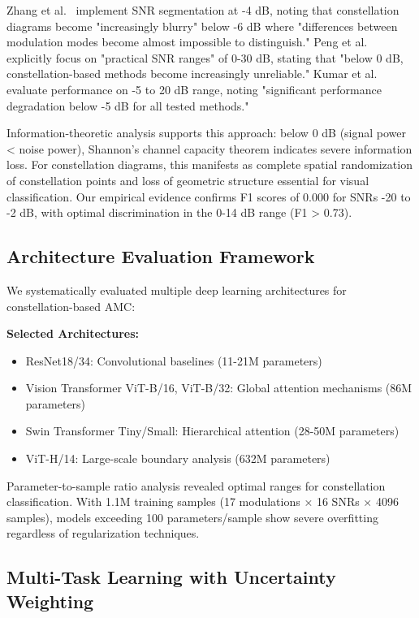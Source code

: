 \documentclass{ELSP}
\begin{document}
{{Zhang et al.~\cite{1} implement SNR segmentation at -4 dB, noting that constellation diagrams become "increasingly blurry" below -6 dB where "differences between modulation modes become almost impossible to distinguish." Peng et al.~\cite{13} explicitly focus on "practical SNR ranges" of 0-30 dB, stating that "below 0 dB, constellation-based methods become increasingly unreliable." Kumar et al.~\cite{14} evaluate performance on -5 to 20 dB range, noting "significant performance degradation below -5 dB for all tested methods."

Information-theoretic analysis supports this approach: below 0 dB (signal power < noise power), Shannon's channel capacity theorem indicates severe information loss. For constellation diagrams, this manifests as complete spatial randomization of constellation points and loss of geometric structure essential for visual classification. Our empirical evidence confirms F1 scores of 0.000 for SNRs -20 to -2 dB, with optimal discrimination in the 0-14 dB range (F1 > 0.73).

\subsection{Architecture Evaluation Framework}

We systematically evaluated multiple deep learning architectures for constellation-based AMC:

\textbf{Selected Architectures:}
\begin{itemize}
    \item ResNet18/34: Convolutional baselines (11-21M parameters)
    \item Vision Transformer ViT-B/16, ViT-B/32: Global attention mechanisms (86M parameters)
    \item Swin Transformer Tiny/Small: Hierarchical attention (28-50M parameters)
    \item ViT-H/14: Large-scale boundary analysis (632M parameters)
\end{itemize}

Parameter-to-sample ratio analysis revealed optimal ranges for constellation classification. With 1.1M training samples (17 modulations × 16 SNRs × 4096 samples), models exceeding 100 parameters/sample show severe overfitting regardless of regularization techniques.

\subsection{Multi-Task Learning with Uncertainty Weighting}

}}
\end{document}
